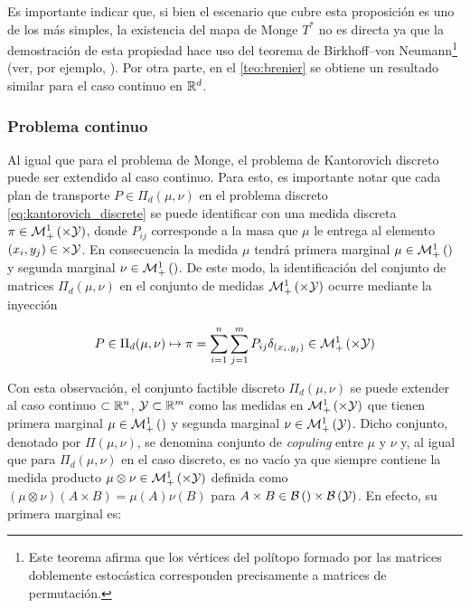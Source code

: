 Es importante indicar que, si bien el escenario que cubre esta proposición es uno de los más simples, la existencia del mapa de Monge $T^*$ no es directa ya que la demostración de esta propiedad hace uso del teorema de Birkhoff–von Neumann\footnote{Este teorema afirma que los vértices del polítopo formado por las matrices doblemente estocástica corresponden precisamente a matrices de permutación.} (ver, por ejemplo, \cite{Thorpe2018}). Por otra parte, en el \autoref{teo:brenier} se obtiene un resultado similar para el caso continuo en $\mathbb{R}^d$.

\subsubsection{Problema continuo}

Al igual que para el problema de Monge, el problema de Kantorovich discreto puede ser extendido al caso continuo. Para esto, es importante notar que cada plan de transporte $P\in\Pi_d(\mu,\nu)$ en el problema discreto \eqref{eq:kantorovich_discrete} se puede identificar con una medida discreta $\pi\in\probmeasure{\xspace\times\yspace}$, donde $P_{ij}$ corresponde a la masa que $\mu$ le entrega al elemento $(x_i,y_j)\in\times\mathcal{Y}$. En consecuencia la medida $\mu$ tendrá primera marginal $\mu\in\mathcal{M}_+^1\left(\right)$ y segunda marginal $\nu\in\mathcal{M}_+^1\left(\right)$. De este modo, la identificación del conjunto de matrices $\Pi_d(\mu,\nu)$ en el conjunto de medidas $\probmeasure{\xspace\times\yspace}$ ocurre mediante la inyección

\begin{equation}
	\label{eq:coupling_identification}
	P\in\Pi_d(\mu,\nu)\mapsto \pi = \sum_{i=1}^{n}\sum_{j=1}^{m} P_{ij}\delta_{(x_i, y_j)} \in\probmeasure{\xspace\times\yspace}
\end{equation}

Con esta observación, el conjunto factible discreto $\Pi_d(\mu,\nu)$ se puede extender al caso continuo $\subset\mathbb{R}^n$, $\mathcal{Y}\subset\mathbb{R}^m$ como las medidas en $\probmeasure{\xspace\times\yspace}$ que tienen primera marginal $\mu\in\mathcal{M}_+^1\left(\right)$ y segunda marginal $\nu\in\mathcal{M}_+^1\left(\mathcal{Y}\right)$. Dicho conjunto, denotado por $\Pi(\mu,\nu)$, se denomina conjunto de \textit{copuling} entre $\mu$ y $\nu$ y, al igual que para $\Pi_d(\mu,\nu)$ en el caso discreto, es no vacío ya que siempre contiene la medida producto $\mu\otimes\nu\in\probmeasure{\xspace\times\yspace}$ definida como $(\mu\otimes\nu)(A\times B)=\mu(A)\nu(B)$ para $A\times B\in\mathcal{B}\left(\right)\times\mathcal{B}\left(\mathcal{Y}\right)$. En efecto, su primera marginal es:

